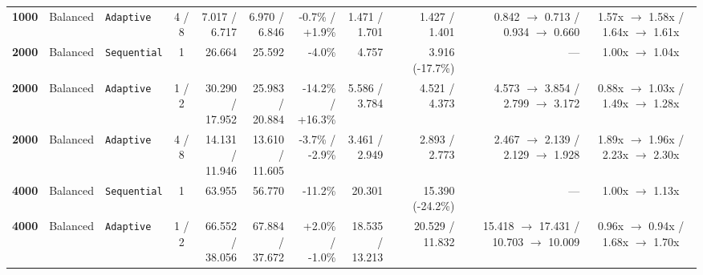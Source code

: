 \documentclass[11pt,a4paper]{article}
\renewcommand{\_}{\textunderscore\allowbreak}
\begin{document}
\begin{table}[H]
{\begin{tabular}{r l l c r r r r r r c}
\textbf{1000} & Balanced & \texttt{Adaptive} & 4 / 8 & \makecell[r]{7.017 /\\ 6.717} & \makecell[r]{6.970 /\\ 6.846} & \makecell[r]{-0.7\% /\\ +1.9\%} & \makecell[r]{1.471 /\\ 1.701} & \makecell[r]{1.427 /\\ 1.401} & \makecell[r]{0.842 $\to$ 0.713 /\\ 0.934 $\to$ 0.660} & \makecell[c]{1.57x $\to$ 1.58x /\\ 1.64x $\to$ 1.61x} \\
\textbf{2000} & Balanced & \texttt{Sequential} & 1 & 26.664 & 25.592 & -4.0\% & 4.757 & 3.916 (-17.7\%) & --- & 1.00x $\to$ 1.04x \\
\textbf{2000} & Balanced & \texttt{Adaptive} & 1 / 2 & \makecell[r]{30.290 /\\ 17.952} & \makecell[r]{25.983 /\\ 20.884} & \makecell[r]{-14.2\% /\\ +16.3\%} & \makecell[r]{5.586 /\\ 3.784} & \makecell[r]{4.521 /\\ 4.373} & \makecell[r]{4.573 $\to$ 3.854 /\\ 2.799 $\to$ 3.172} & \makecell[c]{0.88x $\to$ 1.03x /\\ 1.49x $\to$ 1.28x} \\
\textbf{2000} & Balanced & \texttt{Adaptive} & 4 / 8 & \makecell[r]{14.131 /\\ 11.946} & \makecell[r]{13.610 /\\ 11.605} & \makecell[r]{-3.7\% /\\ -2.9\%} & \makecell[r]{3.461 /\\ 2.949} & \makecell[r]{2.893 /\\ 2.773} & \makecell[r]{2.467 $\to$ 2.139 /\\ 2.129 $\to$ 1.928} & \makecell[c]{1.89x $\to$ 1.96x /\\ 2.23x $\to$ 2.30x} \\
\textbf{4000} & Balanced & \texttt{Sequential} & 1 & 63.955 & 56.770 & -11.2\% & 20.301 & 15.390 (-24.2\%) & --- & 1.00x $\to$ 1.13x \\
\textbf{4000} & Balanced & \texttt{Adaptive} & 1 / 2 & \makecell[r]{66.552 /\\ 38.056} & \makecell[r]{67.884 /\\ 37.672} & \makecell[r]{+2.0\% /\\ -1.0\%} & \makecell[r]{18.535 /\\ 13.213} & \makecell[r]{20.529 /\\ 11.832} & \makecell[r]{15.418 $\to$ 17.431 /\\ 10.703 $\to$ 10.009} & \makecell[c]{0.96x $\to$ 0.94x /\\ 1.68x $\to$ 1.70x} \\

\end{tabular}}
\end{table}
\end{document}
